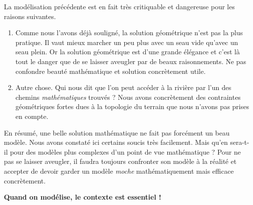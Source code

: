 La modélisation précédente est en fait très critiquable et dangereuse pour les raisons suivantes.

\begin{enumerate}
	\item Comme nous l'avons déjà souligné, la solution géométrique n'est pas la plus pratique. Il vaut mieux marcher un peu plus avec un seau vide qu'avec un seau plein. Or la solution géométrique est d'une grande élégance et c'est là tout le danger que de se laisser aveugler par de beaux raisonnements. Ne pas confondre beauté mathématique et solution concrètement utile.


	\item Autre chose. Qui nous dit que l'on peut accéder à la rivière par l'un des chemins \emph{\og mathématiques \fg} trouvés ? Nous avons concrètement des contraintes géométriques fortes dues à la topologie du terrain que nous n'avons pas prises en compte.
\end{enumerate}


En résumé, une belle solution mathématique ne fait pas forcément un beau modèle. Nous avons constaté ici certains soucis très facilement. Mais qu'en sera-t-il pour des modèles plus complexes d'un point de vue mathématique ? Pour ne pas se laisser aveugler, il faudra toujours confronter son modèle à la réalité et accepter de devoir garder un modèle \emph{\og moche \fg} mathématiquement mais efficace concrètement.


\bigskip


\begin{center}
	\scalebox{2.5}{$\therefore$}

	\vspace{1em}
	
	\textbf{Quand on modélise, le contexte est essentiel !}
\end{center}
